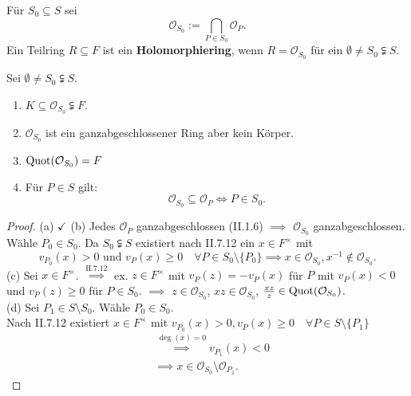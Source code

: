 \begin{definition}
    Für $S_0 \subseteq S$ sei $$\mathcal{O}_{S_0} := \bigcap_{P \in S_0} \mathcal{O}_P.$$ 
    Ein Teilring $R \subseteq F$ ist ein \textbf{Holomorphiering}, wenn $R = \mathcal{O}_{S_0}$ für ein $\emptyset \ne S_0 \subsetneqq S$.
\end{definition}

\begin{lemma}
    Sei $\emptyset \ne S_0 \subsetneqq S$.
    \begin{enumerate}[label=(\alph*)]
        \item $K \subseteq \mathcal{O}_{S_0} \subsetneqq F$.
        \item $\mathcal{O}_{S_0}$ ist ein ganzabgeschlossener Ring aber kein Körper.
        \item $\operatorname{Quot}(\mathcal{O}_{S_0}) = F$
        \item Für $P \in S$ gilt:
        $$ \mathcal{O}_{S_0} \subseteq \mathcal{O}_P \iff P \in S_0.$$
    \end{enumerate} 
\end{lemma}
\begin{proof}
    (a) $\checkmark$ (b) Jedes $\mathcal{O}_P$ ganzabgeschlossen (II.1.6) $\implies$ $\mathcal{O}_{S_0}$ ganzabgeschlossen.
    Wähle $P_0 \in S_0$. Da $S_0 \subsetneqq S$ existiert nach II.7.12 ein $x \in F^\times$ mit
    $$ v_{P_0}(x) > 0 \text{ und } v_P(x) \geq 0 \quad \forall P \in S_0 \setminus \{P_0\} \implies x \in \mathcal{O}_{S_0}, x^{-1} \notin \mathcal{O}_{S_0}.$$
    (c) Sei $x \in F^\times$. $\stackrel{\text{II.7.12}}{\implies}$ ex. $z \in F^\times$ mit $v_P(z) = -v_P(x)$ für $P$ mit $v_P(x) < 0$
    und $v_P(z) \geq 0$ für $P \in S_0$. $\implies$ $z \in \mathcal{O}_{S_0}$, $xz \in \mathcal{O}_{S_0}$, $\frac{xz}{z} \in \operatorname{Quot}(\mathcal{O}_{S_0})$.\\
    (d) Sei $P_1 \in S \setminus S_0$. Wähle $P_0 \in S_0$.\\
    Nach II.7.12 existiert $x \in F^\times$ mit $v_{P_0}(x) > 0, v_P(x) \geq 0 \quad \forall P \in S \setminus\{P_1\}$
    \begin{align*}
        & \stackrel{\deg (x) = 0}{\implies} v_{P_1}(x) < 0\\
        & \implies x \in \mathcal{O}_{S_0} \setminus \mathcal{O}_{P_1}.
    \end{align*}
\end{proof}

